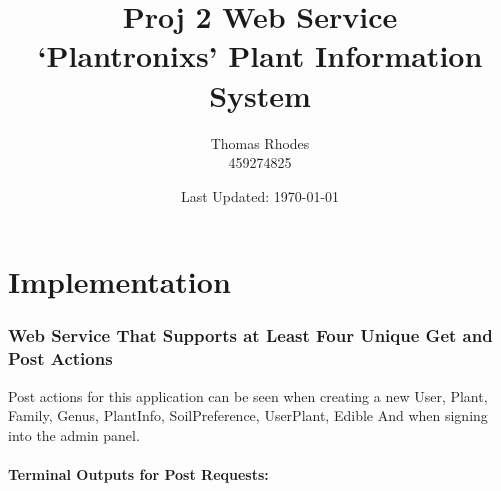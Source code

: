 \documentclass{article}
\title{Proj 2 Web Service \\ `Plantronixs' Plant Information System}
\author{Thomas Rhodes \\ 459274825}
\date{Last Updated: \today}
\begin{document}
    \pagestyle{fancy}
    \fancyhead[C]{}
    \fancyhead[LR]{}
    \fancyfoot[C]{\textcolor{white}{RHODES\_459274825\_PROJ2}}
    \fancyfoot[R]{\textcolor{white}{Version: 1.0 \today}}
	\pagecolor{darkgray}
    \color{white}%
	
	\maketitle


	\tableofcontents
	
	\newpage
	
	\begin{spacing}{2.5}
	\end{spacing}
    

    \part{Implementation}
    \begin{spacing}{4}
    \end{spacing}
	
	\section{Web Service That Supports at Least Four Unique Get and Post Actions}
	
	Post actions for this application can be seen when creating a new User, Plant, Family, Genus, PlantInfo, SoilPreference, UserPlant, Edible And when signing into the admin panel.
	
	\subsection{Terminal Outputs for Post Requests:}
	
\end{document}
